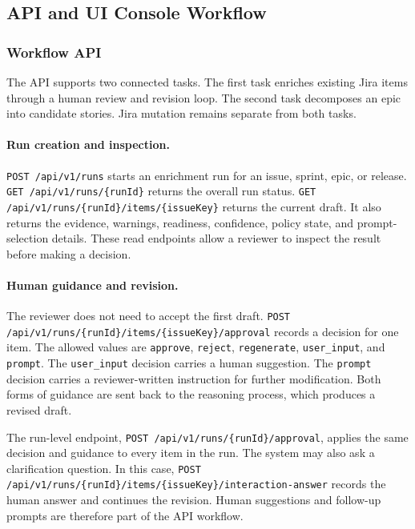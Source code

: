 \documentclass[manuscript,review]{acmart}
\begin{document}
\subsection{API and UI Console Workflow}\label{sec:workflow-ui}

\subsubsection{Workflow API}
The API supports two connected tasks. The first task enriches existing Jira items through a human review and revision loop. The second task decomposes an epic into candidate stories. Jira mutation remains separate from both tasks.

\paragraph{Run creation and inspection.}
\texttt{POST /api/v1/runs} starts an enrichment run for an issue, sprint, epic, or release. \texttt{GET /api/v1/runs/\allowbreak\{runId\}} returns the overall run status. \texttt{GET /api/v1/runs/\allowbreak\{runId\}/\allowbreak{}items/\allowbreak\{issueKey\}} returns the current draft. It also returns the evidence, warnings, readiness, confidence, policy state, and prompt-selection details. These read endpoints allow a reviewer to inspect the result before making a decision.

\paragraph{Human guidance and revision.}
The reviewer does not need to accept the first draft. \texttt{POST /api/v1/runs/\allowbreak\{runId\}/\allowbreak{}items/\allowbreak\{issueKey\}/\allowbreak{}approval} records a decision for one item. The allowed values are \texttt{approve}, \texttt{reject}, \texttt{regenerate}, \texttt{user\_input}, and \texttt{prompt}. The \texttt{user\_input} decision carries a human suggestion. The \texttt{prompt} decision carries a reviewer-written instruction for further modification. Both forms of guidance are sent back to the reasoning process, which produces a revised draft.

The run-level endpoint, \texttt{POST /api/v1/runs/\allowbreak\{runId\}/\allowbreak{}approval}, applies the same decision and guidance to every item in the run. The system may also ask a clarification question. In this case, \texttt{POST /api/v1/runs/\allowbreak\{runId\}/\allowbreak{}items/\allowbreak\{issueKey\}/\allowbreak{}interaction-answer} records the human answer and continues the revision. Human suggestions and follow-up prompts are therefore part of the API workflow.
\end{document}
